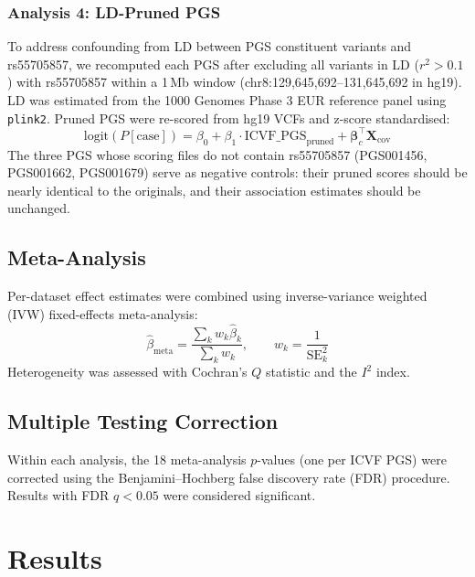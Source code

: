 \documentclass[11pt,a4paper]{article}
\begin{document}
\subsubsection{Analysis 4: LD-Pruned PGS}

To address confounding from LD between PGS constituent variants and rs55705857, we recomputed each PGS after excluding all variants in LD ($r^2 > 0.1$) with rs55705857 within a 1\,Mb window (chr8:129,645,692--131,645,692 in hg19). LD was estimated from the 1000 Genomes Phase 3 EUR reference panel using \texttt{plink2}. Pruned PGS were re-scored from hg19 VCFs and z-score standardised:
\begin{equation}
\text{logit}(P[\text{case}]) = \beta_0 + \beta_1 \cdot \text{ICVF\_PGS}_{\text{pruned}} + \boldsymbol{\beta}_c^\top \mathbf{X}_{\text{cov}}
\end{equation}
The three PGS whose scoring files do not contain rs55705857 (PGS001456, PGS001662, PGS001679) serve as negative controls: their pruned scores should be nearly identical to the originals, and their association estimates should be unchanged.

\subsection{Meta-Analysis}

Per-dataset effect estimates were combined using inverse-variance weighted (IVW) fixed-effects meta-analysis:
\begin{equation}
\hat{\beta}_{\text{meta}} = \frac{\sum_k w_k \hat{\beta}_k}{\sum_k w_k}, \qquad w_k = \frac{1}{\text{SE}_k^2}
\end{equation}
Heterogeneity was assessed with Cochran's $Q$ statistic and the $I^2$ index.

\subsection{Multiple Testing Correction}

Within each analysis, the 18 meta-analysis $p$-values (one per ICVF PGS) were corrected using the Benjamini--Hochberg false discovery rate (FDR) procedure. Results with FDR $q < 0.05$ were considered significant.


\section{Results}
\end{document}
